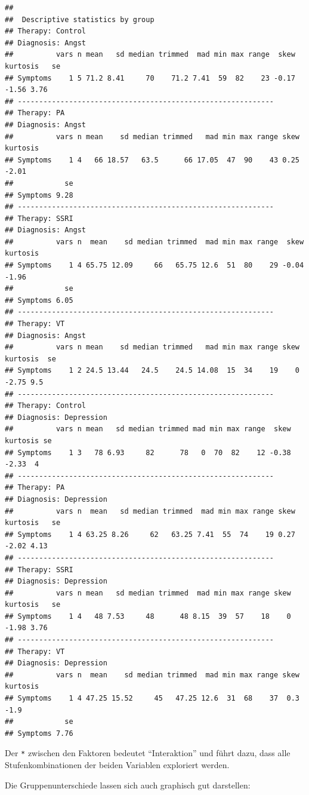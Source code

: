 \documentclass[
]{book}
\begin{document}
\begin{verbatim}
## 
##  Descriptive statistics by group 
## Therapy: Control
## Diagnosis: Angst
##          vars n mean   sd median trimmed  mad min max range  skew kurtosis   se
## Symptoms    1 5 71.2 8.41     70    71.2 7.41  59  82    23 -0.17    -1.56 3.76
## ------------------------------------------------------------ 
## Therapy: PA
## Diagnosis: Angst
##          vars n mean    sd median trimmed   mad min max range skew kurtosis
## Symptoms    1 4   66 18.57   63.5      66 17.05  47  90    43 0.25    -2.01
##            se
## Symptoms 9.28
## ------------------------------------------------------------ 
## Therapy: SSRI
## Diagnosis: Angst
##          vars n  mean    sd median trimmed  mad min max range  skew kurtosis
## Symptoms    1 4 65.75 12.09     66   65.75 12.6  51  80    29 -0.04    -1.96
##            se
## Symptoms 6.05
## ------------------------------------------------------------ 
## Therapy: VT
## Diagnosis: Angst
##          vars n mean    sd median trimmed   mad min max range skew kurtosis  se
## Symptoms    1 2 24.5 13.44   24.5    24.5 14.08  15  34    19    0    -2.75 9.5
## ------------------------------------------------------------ 
## Therapy: Control
## Diagnosis: Depression
##          vars n mean   sd median trimmed mad min max range  skew kurtosis se
## Symptoms    1 3   78 6.93     82      78   0  70  82    12 -0.38    -2.33  4
## ------------------------------------------------------------ 
## Therapy: PA
## Diagnosis: Depression
##          vars n  mean   sd median trimmed  mad min max range skew kurtosis   se
## Symptoms    1 4 63.25 8.26     62   63.25 7.41  55  74    19 0.27    -2.02 4.13
## ------------------------------------------------------------ 
## Therapy: SSRI
## Diagnosis: Depression
##          vars n mean   sd median trimmed  mad min max range skew kurtosis   se
## Symptoms    1 4   48 7.53     48      48 8.15  39  57    18    0    -1.98 3.76
## ------------------------------------------------------------ 
## Therapy: VT
## Diagnosis: Depression
##          vars n  mean    sd median trimmed  mad min max range skew kurtosis
## Symptoms    1 4 47.25 15.52     45   47.25 12.6  31  68    37  0.3     -1.9
##            se
## Symptoms 7.76
\end{verbatim}

Der \texttt{*} zwischen den Faktoren bedeutet ``Interaktion'' und führt dazu, dass alle Stufenkombinationen der beiden Variablen exploriert werden.

Die Gruppenunterschiede lassen sich auch graphisch gut darstellen:
\end{document}
